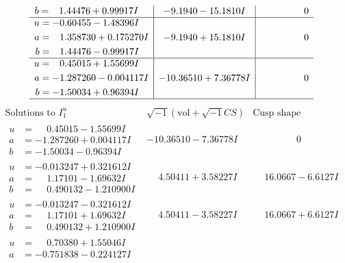 \documentclass[1p]{elsarticle_modified}
\theoremstyle{definition}
\newcommand{\I}{\sqrt{-1}}
\begin{document}
$$\begin{array}{c|c|c}
\begin{aligned}
b &= \phantom{-}1.44476 + 0.99917 I\end{aligned}
 & -9.1940 - 15.1810 I & \phantom{-0.000000 } 0 \\ \hline\begin{aligned}
u &= -0.60455 - 1.48396 I \\
a &= \phantom{-}1.358730 + 0.175270 I \\
b &= \phantom{-}1.44476 - 0.99917 I\end{aligned}
 & -9.1940 + 15.1810 I & \phantom{-0.000000 } 0 \\ \hline\begin{aligned}
u &= \phantom{-}0.45015 + 1.55699 I \\
a &= -1.287260 - 0.004117 I \\
b &= -1.50034 + 0.96394 I\end{aligned}
 & -10.36510 + 7.36778 I & \phantom{-0.000000 } 0\\
 \hline 
 \end{array}$$\newpage$$\begin{array}{c|c|c}  
\text{Solutions to }I^u_{1}& \I (\text{vol} + \sqrt{-1}CS) & \text{Cusp shape}\\
 \hline 
\begin{aligned}
u &= \phantom{-}0.45015 - 1.55699 I \\
a &= -1.287260 + 0.004117 I \\
b &= -1.50034 - 0.96394 I\end{aligned}
 & -10.36510 - 7.36778 I & \phantom{-0.000000 } 0 \\ \hline\begin{aligned}
u &= -0.013247 + 0.321612 I \\
a &= \phantom{-}1.17101 - 1.69632 I \\
b &= \phantom{-}0.490132 - 1.210900 I\end{aligned}
 & \phantom{-}4.50411 + 3.58227 I & \phantom{-}16.0667 - 6.6127 I \\ \hline\begin{aligned}
u &= -0.013247 - 0.321612 I \\
a &= \phantom{-}1.17101 + 1.69632 I \\
b &= \phantom{-}0.490132 + 1.210900 I\end{aligned}
 & \phantom{-}4.50411 - 3.58227 I & \phantom{-}16.0667 + 6.6127 I \\ \hline\begin{aligned}
u &= \phantom{-}0.70380 + 1.55046 I \\
a &= -0.751838 - 0.224127 I \\

\end{aligned}
\end{array}$$
\end{document}
